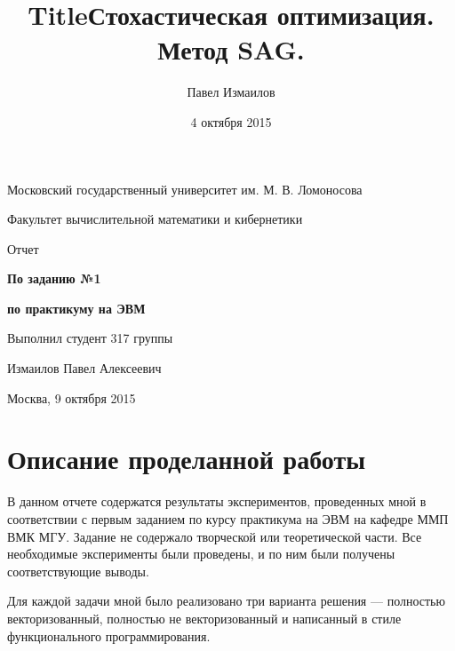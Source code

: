 \documentclass[12pt]{article}
\title{Title}
\title{Стохастическая оптимизация. Метод SAG.}
\date{4 октября 2015}
\author{Павел Измаилов}
\begin{document}
\renewcommand{\contentsname}{\centerline{\bf Содержание}} %

\renewcommand{\refname}{\centerline{\bf Список литературы}}

\newlength{\arrayrulewidthOriginal}
\newcommand{\Cline}[2]{%
  \noalign{\global\setlength{\arrayrulewidthOriginal}{\arrayrulewidth}}%
  \noalign{\global\setlength{\arrayrulewidth}{#1}}\cline{#2}%
  \noalign{\global\setlength{\arrayrulewidth}{\arrayrulewidthOriginal}}}

\centerline{Московский государственный университет им. М. В. Ломоносова}

\centerline{Факультет вычислительной математики и кибернетики}

\vspace{5 cm}

\centerline{\Large Отчет}

\vspace{1 cm}

\centerline{\Large \bf По заданию №1}
\centerline{\Large \bf по практикуму на ЭВМ}

\vspace{6 cm}

\begin{flushright} 
Выполнил студент 317 группы

Измаилов Павел Алексеевич
\end{flushright}

\vfill 

\centerline{Москва,  9 октября 2015}
\thispagestyle{empty} 
\pagebreak

\section{Описание проделанной работы}

В данном отчете содержатся результаты экспериментов, проведенных мной в соответствии с первым заданием по курсу практикума на ЭВМ на кафедре ММП ВМК МГУ. Задание не содержало творческой или теоретической части. Все необходимые эксперименты были проведены, и по ним были получены соответствующие выводы.

Для каждой задачи мной было реализовано три варианта решения — полностью векторизованный, полностью не векторизованный и написанный в стиле функционального программирования. 
\end{document}
